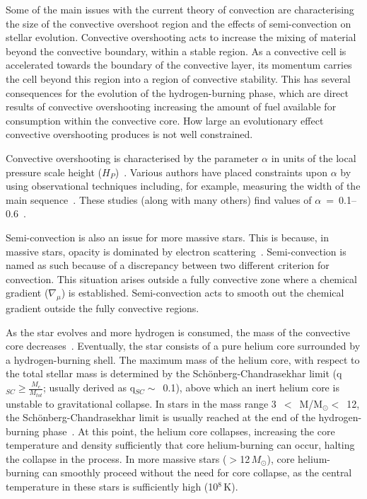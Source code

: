 Some of the main issues with the current theory of convection are characterising the size of the convective overshoot region and the effects of semi-convection on stellar evolution.
Convective overshooting acts to increase the mixing of material beyond the convective boundary, within a stable region.
As a convective cell is accelerated towards the boundary of the convective layer, its momentum carries the cell beyond this region into a region of convective stability.
This has several consequences for the evolution of the hydrogen-burning phase, which are direct results of convective overshooting increasing the amount of fuel available for consumption within the convective core.
How large an evolutionary effect convective overshooting produces is not well constrained.

Convective overshooting is characterised by the parameter $\alpha$ in units of the local pressure scale height ($H_{P}$)~\citep{2012sse..book.....K}.
Various authors have placed constraints upon $\alpha$ by using observational techniques including, for example, measuring the width of the main sequence~\citep{Schroder97,Brott11}.
These studies (along with many others) find values of $\alpha$~=~0.1--0.6~\citep[a recent example is][finding $\alpha = 0.335$]{Brott11}.

Semi-convection is also an issue for more massive stars.
This is because, in massive stars, opacity is dominated by electron scattering~\citep{b:Bohm-vitense92.v3}.
Semi-convection is named as such because of a discrepancy between two different criterion for convection.
This situation arises outside a fully convective zone where a chemical gradient ($\nabla _{\mu}$) is established.
Semi-convection acts to smooth out the chemical gradient outside the fully convective regions.


As the star evolves and more hydrogen is consumed, the mass of the convective core decreases~\citep{2012sse..book.....K}.
Eventually, the star consists of a pure helium core surrounded by a hydrogen-burning shell.
The maximum mass of the helium core, with respect to the total stellar mass is determined by the Sch\"onberg-Chandrasekhar limit
(q$_{SC}\geq\frac{M_{c}}{M_{tot}}$; usually derived as q$_{SC}\sim$~0.1), above which an inert helium core is unstable to gravitational collapse.
In stars in the mass range 3~$<$~M/M$_{\odot}<$~12, the Sch\"onberg-Chandrasekhar limit is usually reached at the end of the hydrogen-burning phase~\citep{b:SalarisCassisi05}.
At this point, the helium core collapses, increasing the core temperature and density sufficiently that core helium-burning can occur, halting the collapse in the process.
In more massive stars ($>$12\,$M_{\odot}$), core helium-burning can smoothly proceed without the need for core collapse, as the central temperature in these stars is sufficiently high (10$^{8}$\,K).

